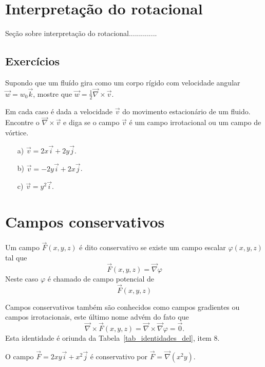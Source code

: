 \section{Interpretação do rotacional}
Seção sobre interpretação do rotacional..............


\subsection*{Exercícios}
\begin{exer}
Supondo que um fluído gira como um corpo rígido com velocidade angular $\vec{w}=w_0\vec{k}$, mostre que $\vec{w}=\frac{1}{2}\vec{\nabla}\times \vec{v}$.
\end{exer}

\begin{exer}
Em cada caso é dada a velocidade $\vec{v}$ do movimento estacionário de um fluido. Encontre o $\vec{\nabla}\times\vec{v}$ e diga se o campo $\vec{v}$ é um campo irrotacional ou um campo de vórtice.
\begin{itemize}
 \item[a)] $\vec{v}=2x\vec{i}+2y\vec{j}$. 
 \item[b)] $\vec{v}=-2y\vec{i}+2x\vec{j}$. 
 \item[c)] $\vec{v}=y^2\vec{i}$. 
 \end{itemize}

\end{exer}




\section{Campos conservativos}
\begin{defn} \label{def_campo_conservativo}  Um campo $\vec{F}(x,y,z)$ é dito conservativo se existe um campo escalar $\varphi(x,y,z)$ tal que
$$\vec{F}(x,y,z) = \vec{\nabla}\varphi$$
Neste caso $\varphi$ é chamado de campo potencial de $$\vec{F}(x,y,z)$$
\end{defn}
\begin{obs} Campos conservativos também são conhecidos como campos gradientes ou campos irrotacionais, este último nome advém do fato que $$\vec{\nabla}\times\vec{F}(x,y,z) = \vec{\nabla}\times\vec{\nabla}\varphi=\vec{0}.$$
Esta identidade é oriunda da Tabela~\ref{tab_identidades_del}, item 8.
 \end{obs}
\begin{ex} O campo $\vec{F}=2xy\vec{i}+x^2\vec{j}$ é conservativo por $\vec{F}=\vec{\nabla}\left(x^2y\right)$.
 \end{ex}

